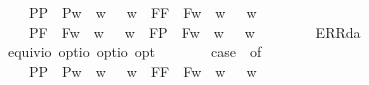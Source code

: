 \begin{isabellebody}
\ \ \ \ {\isacharparenleft}P{\isacharparenleft}{\isasymalpha}{\isacharparenright}{\isacharcomma}P{\isacharparenleft}{\isasymbeta}{\isacharparenright}{\isacharparenright}\ {\isasymRightarrow}\ P{\isacharparenleft}{\isasymlambda}w{\isachardot}\ {\isasymalpha}\ w\ {\isasymor}\ {\isasymbeta}\ w{\isacharparenright}\ {\isacharbar}\ {\isacharparenleft}F{\isacharparenleft}{\isasymalpha}{\isacharparenright}{\isacharcomma}F{\isacharparenleft}{\isasymbeta}{\isacharparenright}{\isacharparenright}\ {\isasymRightarrow}\ F{\isacharparenleft}{\isasymlambda}w{\isachardot}\ {\isasymalpha}\ w\ {\isasymor}\ {\isasymbeta}\ w{\isacharparenright}\ {\isacharbar}\ \isanewline
\ \ \ \ {\isacharparenleft}P{\isacharparenleft}{\isasymalpha}{\isacharparenright}{\isacharcomma}F{\isacharparenleft}{\isasymbeta}{\isacharparenright}{\isacharparenright}\ {\isasymRightarrow}\ F{\isacharparenleft}{\isasymlambda}w{\isachardot}\ {\isasymalpha}\ w\ {\isasymor}\ {\isasymbeta}\ w{\isacharparenright}\ {\isacharbar}\ {\isacharparenleft}F{\isacharparenleft}{\isasymalpha}{\isacharparenright}{\isacharcomma}P{\isacharparenleft}{\isasymbeta}{\isacharparenright}{\isacharparenright}\ {\isasymRightarrow}\ F{\isacharparenleft}{\isasymlambda}w{\isachardot}\ {\isasymalpha}\ w\ {\isasymor}\ {\isasymbeta}\ w{\isacharparenright}\ {\isacharbar}\ \isanewline
\ \ \ \ {\isacharunderscore}\ {\isasymRightarrow}\ ERR{\isacharparenleft}da{\isacharparenright}{\isachardoublequoteclose}\ \ \isanewline
\isanewline
\ \isamarkupfalse%
\ equiv{\isacharcolon}{\isacharcolon}{\isachardoublequoteopen}io\ opt{\isasymRightarrow}io\ opt{\isasymRightarrow}io\ opt{\isachardoublequoteclose}\ {\isacharparenleft}\ {\isachardoublequoteopen}\isactrlbold {\isasymequiv}{\isachardoublequoteclose}\ {}{}{\isacharparenright}\ \ {\isachardoublequoteopen}{\isasymphi}\ \isactrlbold {\isasymequiv}\ {\isasympsi}{\isasymequiv}\ case\ {\isacharparenleft}{\isasymphi}{\isacharcomma}{\isasympsi}{\isacharparenright}\ of\isanewline
\ \ \ \ {\isacharparenleft}P{\isacharparenleft}{\isasymalpha}{\isacharparenright}{\isacharcomma}P{\isacharparenleft}{\isasymbeta}{\isacharparenright}{\isacharparenright}\ {\isasymRightarrow}\ P{\isacharparenleft}{\isasymlambda}w{\isachardot}\ {\isasymalpha}\ w\ {\isasymlongleftrightarrow}\ {\isasymbeta}\ w{\isacharparenright}\ {\isacharbar}\ {\isacharparenleft}F{\isacharparenleft}{\isasymalpha}{\isacharparenright}{\isacharcomma}F{\isacharparenleft}{\isasymbeta}{\isacharparenright}{\isacharparenright}\ {\isasymRightarrow}\ F{\isacharparenleft}{\isasymlambda}w{\isachardot}\ {\isasymalpha}\ w\ {\isasymlongleftrightarrow}\ {\isasymbeta}\ w{\isacharparenright}\ {\isacharbar}\ \isanewline

\end{isabellebody}
